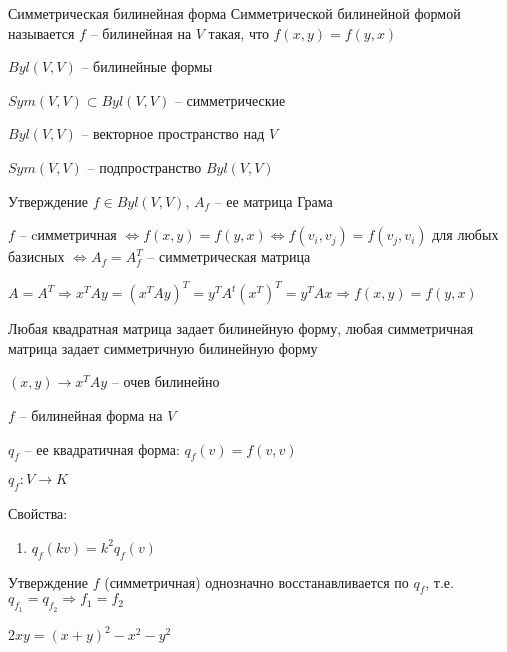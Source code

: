 \documentclass[12pt]{article}
\begin{document}
\begin{defin}{Симметрическая билинейная форма}
    Симметрической билинейной формой называется $f$ -- билинейная на $V$ такая, что $f(x, y) = f(y, x)$

    $Byl(V, V)$ -- билинейные формы

    $Sym(V, V) \subset Byl(V, V)$ -- симметрические
\end{defin}

\begin{Remark}{}
    $Byl(V, V)$ -- векторное пространство над $V$

    $Sym(V, V)$ -- подпространство $Byl(V, V)$
\end{Remark}

\begin{theo}{Утверждение}
    $f \in Byl(V, V)$, $A_f$ -- ее матрица Грама

    $f$ -- cимметричная $\Leftrightarrow f(x, y) = f(y, x) \Leftrightarrow f(v_i, v_j) = f(v_j, v_i)$ для любых базисных $\Leftrightarrow A_f = A_f^T$ -- симметрическая матрица

    $A = A^T \Rightarrow x^TAy = (x^TAy)^T = y^TA^t(x^T)^T = y^TAx \Rightarrow f(x, y) = f(y, x)$
\end{theo}

\begin{Remark}{}
    Любая квадратная матрица задает билинейную форму, любая симметричная матрица задает симметричную билинейную форму

    $(x, y) \to x^TAy$ -- очев билинейно 
\end{Remark}

\begin{defin}{}
    $f$ -- билинейная форма на $V$

    $q_f$ -- ее квадратичная форма: $q_f(v) = f(v, v)$

    $q_f : V \to K$

    Свойства:

    \begin{enumerate}
        \item $q_f(kv) = k^2q_f(v)$
    \end{enumerate}
\end{defin}

\begin{theo}{Утверждение}
    $f$ (симметричная) однозначно восстанавливается по $q_f$, т.е. $q_{f_1} = q_{f_2} \Rightarrow f_1 = f_2$

    $2xy = (x + y)^2 - x^2 - y^2$
\end{theo}
\end{document}
